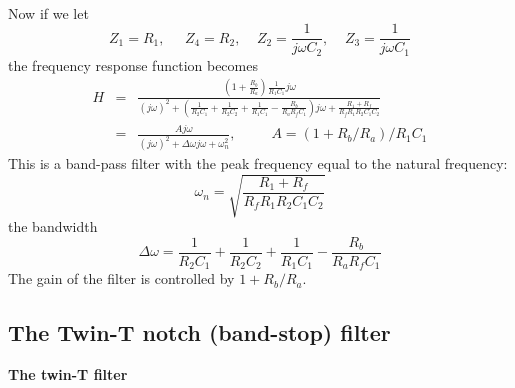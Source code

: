 \begin{itemize}
\begin{eqnarray}
  \end{eqnarray}
  Now if we let
  \[
  Z_1=R_1,\;\;\;\;\;Z_4=R_2,\;\;\;\;Z_2=\frac{1}{j\omega C_2},
  \;\;\;\;Z_3=\frac{1}{j\omega C_1}
  \]
  the frequency response function becomes
  \begin{eqnarray}
  H&=&\frac{\left(1+\frac{R_b}{R_a}\right)\frac{1}{R_1C_1}j\omega}{(j\omega)^2+\left(\frac{1}{R_2C_1}+\frac{1}{R_2C_2}+\frac{1}{R_1C_1}-\frac{R_b}{R_aR_fC_1}\right)j\omega+\frac{R_1+R_f}{R_fR_1R_2C_1C_2}}
  \nonumber\\
  &=&\frac{Aj\omega}{(j\omega)^2+\Delta\omega j\omega+\omega_n^2},
  \;\;\;\;\;\;\;\;\;
  A=(1+R_b/R_a)/R_1C_1
  \nonumber
  \end{eqnarray}
  This is a band-pass filter with the peak frequency equal to the natural
  frequency:
  \[
  \omega_n=\sqrt{\frac{R_1+R_f}{R_fR_1R_2C_1C_2}}
  \]
  the bandwidth
  \[
  \Delta\omega=\frac{1}{R_2C_1}+\frac{1}{R_2C_2}+\frac{1}{R_1C_1}-\frac{R_b}{R_aR_fC_1}
  \]
  The gain of the filter is controlled by $1+R_b/R_a$.
  
\end{itemize}


\subsection{The Twin-T notch (band-stop) filter}

{\bf The twin-T filter}


